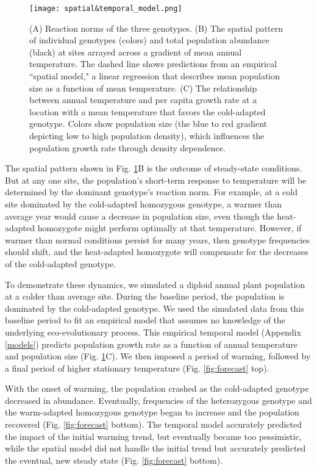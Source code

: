 \documentclass[11pt]{article}
\begin{document}
\begin{figure}[tbp]
\centering
\texttt{[image: spatial\&temporal\_model.png]}
\caption{(A) Reaction norms of the three genotypes. (B) The spatial pattern of individual genotypes (colors) and total population abundance (black) at sites arrayed across a gradient of mean annual temperature. The dashed line shows predictions from an empirical ``spatial model," a linear regression that describes mean population size as a function of mean temperature. (C) The relationship between annual temperature and per capita growth rate at a location with a mean temperature that favors the cold-adapted genotype. Colors show population size (the blue to red gradient depicting low to high population density), which influences the population growth rate through density dependence. }
\label{fig:evo_evo_spatial_temporal_models}
\end{figure}

The spatial pattern shown in Fig. \ref{fig:evo_evo_spatial_temporal_models}B is the outcome of steady-state conditions. But at any one site, the population's short-term response to temperature will be determined by the dominant genotype's reaction norm. For example, at a cold site dominated by the cold-adapted homozygous genotype, a warmer than average year would cause a decrease in population size, even though the heat-adapted homozygote might perform optimally at that temperature. However, if warmer than normal conditions persist for many years, then genotype frequencies should shift, and the heat-adapted homozygote will compensate for the decreases of the cold-adapted genotype. 

To demonstrate these dynamics, we simulated a diploid annual plant population at a colder than average site. During the baseline period, the population is dominated by the cold-adapted genotype. We used the simulated data from this baseline period to fit an empirical model that assumes no knowledge of the underlying eco-evolutionary process. This empirical temporal model (Appendix \ref{models}) predicts population growth rate as a function of annual temperature and population size (Fig. \ref{fig:evo_evo_spatial_temporal_models}C). We then imposed a period of warming, followed by a final period of higher stationary temperature (Fig. \ref{fig:forecast} top).

With the onset of warming, the population crashed as the cold-adapted genotype decreased in abundance. Eventually, frequencies of the heterozygous genotype and the warm-adapted homozygous genotype began to increase and the population recovered (Fig. \ref{fig:forecast} bottom). The temporal model accurately predicted the impact of the initial warming trend, but eventually became too pessimistic, while the spatial model did not handle the initial trend but accurately predicted the eventual, new steady state (Fig. \ref{fig:forecast} bottom).
\end{document}
